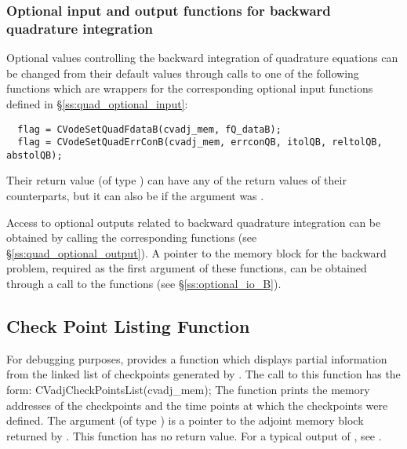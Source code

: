 \subsubsection{Optional input and output functions for backward quadrature integration}

Optional values controlling the backward integration of quadrature equations can be changed
from their default values through calls to one of the following functions which are wrappers for
the corresponding optional input functions defined in \S\ref{ss:quad_optional_input}:
\begin{verbatim}
  flag = CVodeSetQuadFdataB(cvadj_mem, fQ_dataB);
  flag = CVodeSetQuadErrConB(cvadj_mem, errconQB, itolQB, reltolQB, abstolQB);
\end{verbatim}
Their return value  (of type ) can have any of the return values 
of their counterparts, but it can also be  if the  
argument was . 

Access to optional outputs related to backward quadrature integration can be obtained
by calling the corresponding  functions 
(see \S\ref{ss:quad_optional_output}). 
A pointer to the {\cvodes} memory block for the backward problem, required as the first 
argument of these functions, can be obtained through a call to the functions 
 (see \S\ref{ss:optional_io_B}).


\subsection{Check Point Listing Function}

For debugging purposes, {\cvodes} provides a function  which
displays partial information from the linked list of checkpoints generated by
. The call to this function has the form:
{
  CVadjCheckPointsList(cvadj\_mem);
}
{
  The function  prints
  the memory addresses of the checkpoints and the time points at
  which the checkpoints were defined.
}
{
  The argument  (of type ) is a pointer to the
  adjoint memory block returned by .
}
{
  This function has no return value.
}
{
  For a typical output of , see \cite{cvodes2.1.0_ex}.
}

